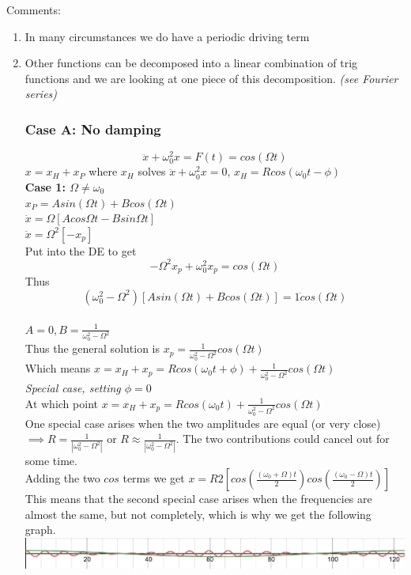 \documentclass[11pt]{article}
\theoremstyle{definition}
\begin{document}
Comments:\begin{enumerate}[topsep=-10pt]
    \item In many circumstances we do have a periodic driving term
    \item Other functions can be decomposed into a linear combination of trig functions and we are looking at one piece of this decomposition.
    \textit{(see Fourier series)}
\subsubsection{Case A: No damping}
$$\ddot{x} + \omega_0^2x = F(t) = cos(\Omega t)$$
$x = x_H + x_P$ where $x_H$ solves $\ddot{x} + \omega_0^2x = 0$, $x_H = Rcos(\omega_0 t - \phi)$\\
\textbf{Case 1: $\Omega \neq \omega_0$}\\
$x_P = Asin(\Omega t) + Bcos(\Omega t)$\\
$\dot{x}  = \Omega[A cos\Omega t - Bsin\Omega t]$\\
$\ddot{x} = \Omega^2 [-x_p]$\\
Put into the DE to get 
$$-\Omega^2x_p + \omega_0^2x_p = cos(\Omega t)$$
Thus
$$(\omega_0^2-\Omega^2)[Asin(\Omega t) + Bcos(\Omega t)] = 1\dot cos(\Omega t)$$\\
$A = 0, B = \frac{1}{\omega_0^2-\Omega^2}$\\
Thus the general solution is $x_p = \frac{1}{\omega_0^2-\Omega^2} cos(\Omega t)$\\
Which means $x = x_H + x_p = Rcos(\omega_0t + \phi) + \frac{1}{\omega_0^2-\Omega^2} cos(\Omega t)$\\
\textit{Special case, setting $\phi = 0$}\\
At which point $x = x_H + x_p = Rcos(\omega_0t) + \frac{1}{\omega_0^2-\Omega^2} cos(\Omega t)$\\
One special case arises when the two amplitudes are equal (or very close) $\implies R = \frac{1}{|\omega_0^2-\Omega^2|}$ or $R \approx \frac{1}{|\omega_0^2-\Omega^2|}$. The two contributions could cancel out for some time.\\
Adding the two $cos$ terms we get $x = R2[cos(\frac{(\omega_0 + \Omega)t}{2})cos(\frac{(\omega_0 - \Omega)t}{2})]$\\
This means that the second special case arises when the frequencies are almost the same, but not completely, which is why we get the following graph.\\
\includegraphics[width=\textwidth]{coscos.png}\\

\end{enumerate}
\end{document}
